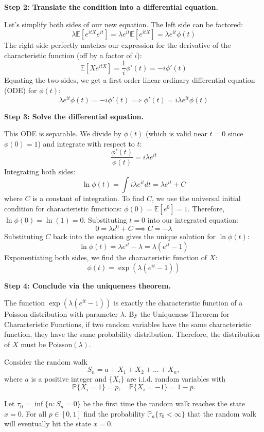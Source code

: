 \begin{solution}
\textbf{Step 2: Translate the condition into a differential equation.}

Let's simplify both sides of our new equation.
The left side can be factored:
\[ \lambda \mathbb{E}[e^{itX} e^{it}] = \lambda e^{it} \mathbb{E}[e^{itX}] = \lambda e^{it} \phi(t) \]
The right side perfectly matches our expression for the derivative of the characteristic function (off by a factor of $i$):
\[ \mathbb{E}[X e^{itX}] = \frac{1}{i} \phi'(t) = -i \phi'(t) \]
Equating the two sides, we get a first-order linear ordinary differential equation (ODE) for $\phi(t)$:
\[ \lambda e^{it} \phi(t) = -i \phi'(t) \implies \phi'(t) = i \lambda e^{it} \phi(t) \]

\textbf{Step 3: Solve the differential equation.}

This ODE is separable. We divide by $\phi(t)$ (which is valid near $t=0$ since $\phi(0)=1$) and integrate with respect to $t$:
\[ \frac{\phi'(t)}{\phi(t)} = i \lambda e^{it} \]
Integrating both sides:
\[ \ln \phi(t) = \int i \lambda e^{it} dt = \lambda e^{it} + C \]
where $C$ is a constant of integration.
To find $C$, we use the universal initial condition for characteristic functions: $\phi(0) = \mathbb{E}[e^0] = 1$.
Therefore, $\ln \phi(0) = \ln(1) = 0$.
Substituting $t=0$ into our integrated equation:
\[ 0 = \lambda e^0 + C \implies C = -\lambda \]
Substituting $C$ back into the equation gives the unique solution for $\ln \phi(t)$:
\[ \ln \phi(t) = \lambda e^{it} - \lambda = \lambda(e^{it} - 1) \]
Exponentiating both sides, we find the characteristic function of $X$:
\[ \phi(t) = \exp(\lambda(e^{it} - 1)) \]

\textbf{Step 4: Conclude via the uniqueness theorem.}

The function $\exp(\lambda(e^{it} - 1))$ is exactly the characteristic function of a Poisson distribution with parameter $\lambda$.
By the Uniqueness Theorem for Characteristic Functions, if two random variables have the same characteristic function, they have the same probability distribution.
Therefore, the distribution of $X$ must be $\text{Poisson}(\lambda)$.
\end{solution}

\begin{exercise}\label{probability:2020:3}
Consider the random walk
\[
S_n = a + X_1 + X_2 + \dots + X_n,
\]
where $a$ is a positive integer and $\{X_i\}$ are i.i.d. random variables with
\[
\mathbb{P}\{X_i = 1\} = p, \quad \mathbb{P}\{X_i = -1\} = 1-p.
\]

Let $\tau_0 = \inf\{n: S_n = 0\}$ be the first time the random walk reaches the state $x=0$. For all $p \in [0,1]$ find the probability $\mathbb{P}_a\{\tau_0 < \infty\}$ that the random walk will eventually hit the state $x=0$.
\end{exercise}

